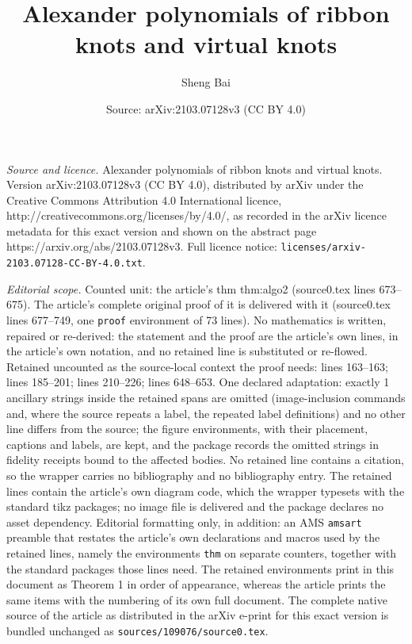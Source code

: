 \documentclass[10pt,a4paper]{amsart}
\title{Alexander polynomials of ribbon knots and virtual knots}
\author{Sheng Bai}
\date{Source: arXiv:2103.07128v3 (CC BY 4.0)}
\begin{document}
\maketitle

\noindent\emph{Source and licence.} Alexander polynomials of ribbon knots and virtual knots. Version arXiv:2103.07128v3 (CC BY 4.0), distributed by arXiv under the Creative Commons Attribution 4.0 International licence, http://creativecommons.org/licenses/by/4.0/, as recorded in the arXiv licence metadata for this exact version and shown on the abstract page https://arxiv.org/abs/2103.07128v3. Full licence notice: \texttt{licenses/arxiv-2103.07128-CC-BY-4.0.txt}.\par\smallskip

\noindent\textit{Editorial scope.} Counted unit: the article's thm thm:algo2 (source0.tex lines 673--675). The article's complete original proof of it is delivered with it (source0.tex lines 677--749, one \texttt{proof} environment of 73 lines). No mathematics is written, repaired or re-derived: the statement and the proof are the article's own lines, in the article's own notation, and no retained line is substituted or re-flowed.  Retained uncounted as the source-local context the proof needs: lines 163--163; lines 185--201; lines 210--226; lines 648--653.  One declared adaptation: exactly 1 ancillary strings inside the retained spans are omitted (image-inclusion commands and, where the source repeats a label, the repeated label definitions) and no other line differs from the source; the figure environments, with their placement, captions and labels, are kept, and the package records the omitted strings in fidelity receipts bound to the affected bodies.  No retained line contains a citation, so the wrapper carries no bibliography and no bibliography entry.  The retained lines contain the article's own diagram code, which the wrapper typesets with the standard tikz packages; no image file is delivered and the package declares no asset dependency.  Editorial formatting only, in addition: an AMS \texttt{amsart} preamble that restates the article's own declarations and macros used by the retained lines, namely the environments \texttt{thm} on separate counters, together with the standard packages those lines need.  The retained environments print in this document as Theorem 1 in order of appearance, whereas the article prints the same items with the numbering of its own full document.  The complete native source of the article as distributed in the arXiv e-print for this exact version is bundled unchanged as \texttt{sources/109076/source0.tex}.
\end{document}
